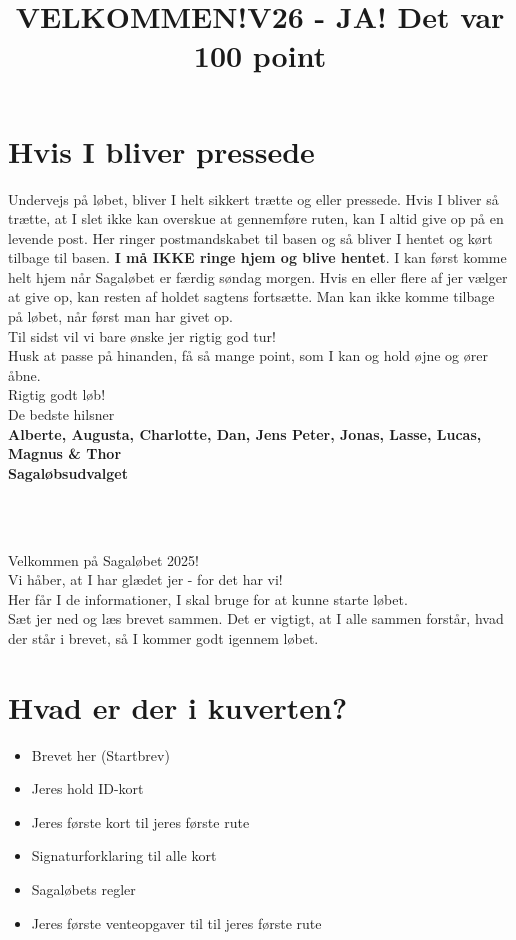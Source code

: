 \section{Hvis I bliver pressede}
Undervejs på løbet, bliver I helt sikkert trætte og eller pressede. Hvis I bliver så trætte, at I slet ikke kan overskue at gennemføre ruten, kan I altid give op på en levende post. Her ringer postmandskabet til basen og så bliver I hentet og kørt tilbage til basen. \textbf{I må IKKE ringe hjem og blive hentet}. I kan først komme helt hjem når Sagaløbet er færdig søndag morgen. Hvis en eller flere af jer vælger at give op, kan resten af holdet sagtens fortsætte. Man kan ikke komme tilbage på løbet, når først man har givet op.\\
\newline
Til sidst vil vi bare ønske jer rigtig god tur!\\
Husk at passe på hinanden, få så mange point, som I kan og hold øjne og ører åbne.\\
\newline
Rigtig godt løb!\\
\newline
\textcolor{søblå}{De bedste hilsner}\\
\textcolor{natblå}{\textbf{Alberte, Augusta, Charlotte, Dan, Jens Peter, Jonas, Lasse, Lucas, Magnus \& Thor}}\\
\textcolor{natblå}{\textbf{Sagaløbsudvalget}}\\
\newpage
\title{VELKOMMEN!}\\
\newline
\title{\textcolor{søblå}{V26 - JA! Det var 100 point }}\\
\newline
Velkommen på Sagaløbet 2025!\\
Vi håber, at I har glædet jer - for det har vi!\\
Her får I de informationer, I skal bruge for at kunne starte løbet.\\
Sæt jer ned og læs brevet sammen. Det er vigtigt, at I alle sammen forstår, hvad der står i brevet, så I kommer godt igennem løbet.
\section{Hvad er der i kuverten?}
\begin{itemize}
    \item Brevet her (Startbrev)
    \item Jeres hold ID-kort
    \item Jeres første kort til jeres første rute
    \item Signaturforklaring til alle kort
    \item Sagaløbets regler
    \item Jeres første venteopgaver til til jeres første rute
\end{itemize}
